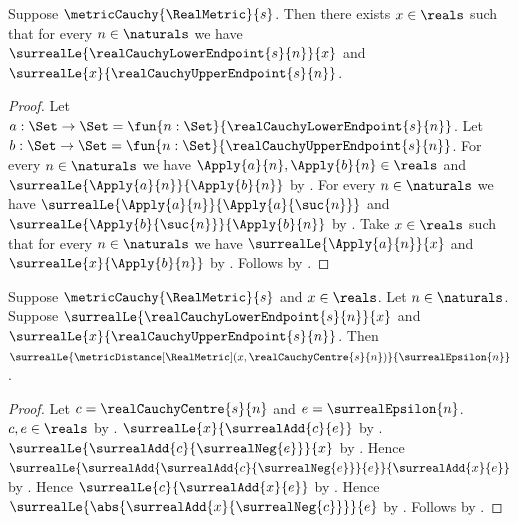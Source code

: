 \begin{theorem}\label{real_cauchy_nested_point_exists}
    Suppose $\metricCauchy{\RealMetric}{s}$.
    Then there exists $x\in\reals$ such that for every $n\in\naturals$
        we have
            $\surrealLe{\realCauchyLowerEndpoint{s}{n}}{x}$ and
            $\surrealLe{x}{\realCauchyUpperEndpoint{s}{n}}$.
\end{theorem}
\begin{proof}
    Let $a:\Set\to\Set
        =\fun{n:\Set}{\realCauchyLowerEndpoint{s}{n}}$.
    Let $b:\Set\to\Set
        =\fun{n:\Set}{\realCauchyUpperEndpoint{s}{n}}$.
    For every $n\in\naturals$ we have
        $\Apply{a}{n},\Apply{b}{n}\in\reals$ and
        $\surrealLe{\Apply{a}{n}}{\Apply{b}{n}}$
        by
        .
    For every $n\in\naturals$ we have
        $\surrealLe{\Apply{a}{n}}{\Apply{a}{\suc{n}}}$ and
        $\surrealLe{\Apply{b}{\suc{n}}}{\Apply{b}{n}}$
        by .
    Take $x\in\reals$ such that for every $n\in\naturals$ we have
        $\surrealLe{\Apply{a}{n}}{x}$ and
        $\surrealLe{x}{\Apply{b}{n}}$
        by .
    Follows by \auto.
\end{proof}

\begin{proposition}\label{real_cauchy_nested_point_bound}
    Suppose $\metricCauchy{\RealMetric}{s}$ and $x\in\reals$.
    Let $n\in\naturals$.
    Suppose $\surrealLe{\realCauchyLowerEndpoint{s}{n}}{x}$ and
        $\surrealLe{x}{\realCauchyUpperEndpoint{s}{n}}$.
    Then
        $\surrealLe{
            \metricDistance[\RealMetric]
                (x,\realCauchyCentre{s}{n})}
            {\surrealEpsilon{n}}$.
\end{proposition}
\begin{proof}
    Let $c=\realCauchyCentre{s}{n}$ and $e=\surrealEpsilon{n}$.
    $c,e\in\reals$
        by .
    $\surrealLe{x}{\surrealAdd{c}{e}}$
        by .
    $\surrealLe{\surrealAdd{c}{\surrealNeg{e}}}{x}$
        by .
    Hence
        $\surrealLe{
            \surrealAdd{\surrealAdd{c}{\surrealNeg{e}}}{e}}
            {\surrealAdd{x}{e}}$
        by
        .
    Hence $\surrealLe{c}{\surrealAdd{x}{e}}$
        by
        .
    Hence
        $\surrealLe{\abs{\surrealAdd{x}{\surrealNeg{c}}}}{e}$
        by .
    Follows by .
\end{proof}

